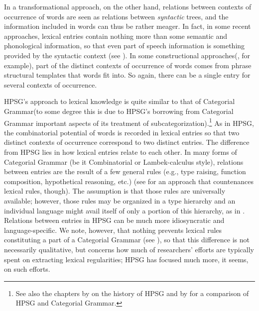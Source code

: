 \documentclass[output=paper,biblatex,babelshorthands,newtxmath,draftmode,colorlinks,citecolor=brown]{langscibook}
\begin{document}
In a transformational approach, on the other hand, relations between contexts of occurrence of words are seen as relations between \emph{syntactic} trees, and the information included in words can thus be rather meager. In fact, in some recent approaches, lexical entries contain nothing more than some semantic and phonological information, so that even part of speech information is something provided by the syntactic context (see \citealt{Borer2003,Marantz1997}). In some constructional approaches\indexcxg (\citealt{Goldberg1995}, for example), part of the distinct contexts of occurrence of words comes from phrase structural templates that words fit into. So again, there can be a single entry for several contexts of occurrence.

HPSG's approach to lexical knowledge is quite similar to that of Categorial Grammar\indexcg (to some degree this is due to HPSG's borrowing from Categorial Grammar important aspects of its treatment of subcategorization).\footnote{
See also the chapters by  on the history of HPSG and by  for a comparison of HPSG and Categorial Grammar.} As in HPSG, the combinatorial potential of words is recorded in lexical entries so that two distinct contexts of occurrence correspond to two distinct entries. The difference from HPSG lies in how lexical entries relate to each other. In many forms of Categorial Grammar (be it Combinatorial or Lambek-calculus style), relations between entries are the result of a few general rules (e.g., type raising, function composition, hypothetical reasoning, etc.) (see \citealt{Dowty1978} for an approach that countenances lexical rules, though).
The assumption is that those rules are universally available; however, those rules may be organized in a type hierarchy and an individual language might avail itself of only a portion of this hierarchy, as in \citet{Baldridge2002}. Relations between entries in HPSG can be much more idiosyncratic and language-specific. We note, however, that nothing prevents lexical rules constituting a part of a Categorial Grammar (see \citealt{Carpenter1992b}),
so that this difference is not necessarily qualitative, but concerns how much of researchers' efforts are typically spent on extracting lexical regularities; HPSG has focused much more, it seems, on such efforts.
\end{document}
